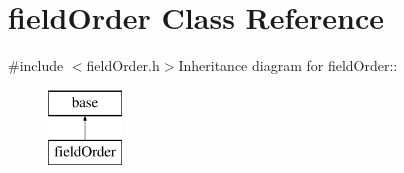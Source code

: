 \hypertarget{classfield_order}{
\section{fieldOrder Class Reference}
\label{classfield_order}
}


{\ttfamily \#include $<$fieldOrder.h$>$}Inheritance diagram for fieldOrder::\begin{figure}[H]
\begin{center}
\leavevmode
\includegraphics[height=2cm]{classfield_order}
\end{center}
\end{figure}
